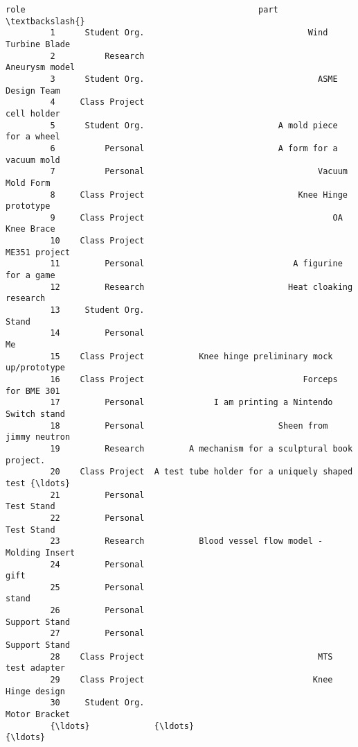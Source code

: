 \documentclass[11pt]{article}
\begin{document}
\begin{Verbatim}[commandchars=\\\{\}]
                        role                                               part  \textbackslash{}
         1      Student Org.                                 Wind Turbine Blade   
         2          Research                                     Aneurysm model   
         3      Student Org.                                   ASME Design Team   
         4     Class Project                                        cell holder   
         5      Student Org.                           A mold piece for a wheel   
         6          Personal                           A form for a vacuum mold   
         7          Personal                                   Vacuum Mold Form   
         8     Class Project                               Knee Hinge prototype   
         9     Class Project                                      OA Knee Brace   
         10    Class Project                                      ME351 project   
         11         Personal                              A figurine for a game   
         12         Research                             Heat cloaking research   
         13     Student Org.                                              Stand   
         14         Personal                                                 Me   
         15    Class Project           Knee hinge preliminary mock up/prototype   
         16    Class Project                                Forceps for BME 301   
         17         Personal              I am printing a Nintendo Switch stand   
         18         Personal                           Sheen from jimmy neutron   
         19         Research         A mechanism for a sculptural book project.   
         20    Class Project  A test tube holder for a uniquely shaped test {\ldots}   
         21         Personal                                         Test Stand   
         22         Personal                                         Test Stand   
         23         Research           Blood vessel flow model - Molding Insert   
         24         Personal                                               gift   
         25         Personal                                              stand   
         26         Personal                                      Support Stand   
         27         Personal                                      Support Stand   
         28    Class Project                                   MTS test adapter   
         29    Class Project                                  Knee Hinge design   
         30     Student Org.                                      Motor Bracket   
         {\ldots}             {\ldots}                                                {\ldots}   

\end{Verbatim}
\end{document}
